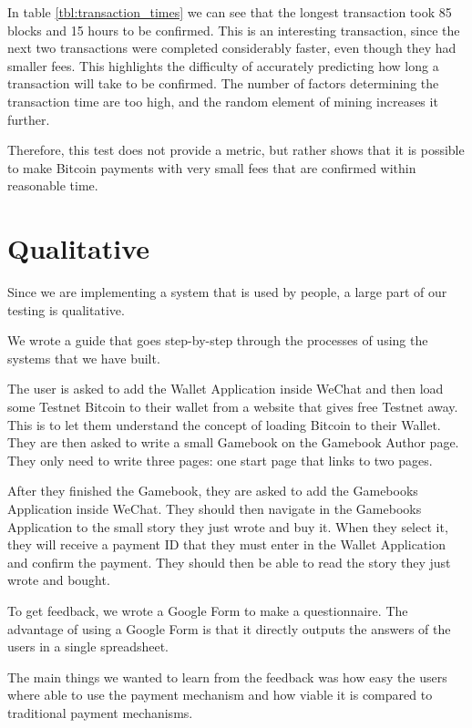 In table \ref{tbl:transaction_times} we can see that the longest transaction took 85 blocks and 15 hours to be confirmed. This is an interesting transaction, since the next two transactions were completed considerably faster, even though they had smaller fees. This highlights the difficulty of accurately predicting how long a transaction will take to be confirmed. The number of factors determining the transaction time are too high, and the random element of mining increases it further.

Therefore, this test does not provide a metric, but rather shows that it is possible to make Bitcoin payments with very small fees that are confirmed within reasonable time. 

	
\section{Qualitative}

Since we are implementing a system that is used by people, a large part of our testing is qualitative.

We wrote a guide that goes step-by-step through the processes of using the systems that we have built.

The user is asked to add the Wallet Application inside WeChat and then load some Testnet Bitcoin to their wallet from a website that gives free Testnet away. This is to let them understand the concept of loading Bitcoin to their Wallet. They are then asked to write a small Gamebook on the Gamebook Author page. They only need to write three pages: one start page that links to two pages.

After they finished the Gamebook, they are asked to add the Gamebooks Application inside WeChat. They should then navigate in the Gamebooks Application to the small story they just wrote and buy it. When they select it, they will receive a payment ID that they must enter in the Wallet Application and confirm the payment. They should then be able to read the story they just wrote and bought.

To get feedback, we wrote a Google Form to make a questionnaire. The advantage of using a Google Form is that it directly outputs the answers of the users in a single spreadsheet.

The main things we wanted to learn from the feedback was how easy the users where able to use the payment mechanism and how viable it is compared to traditional payment mechanisms.

